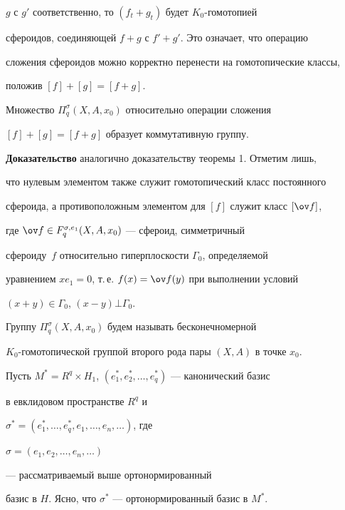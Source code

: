 $g$ с $g'$ соответственно, то $(f_t+g_t)$ будет $K_0$-гомотопией 


сфероидов, соединяющей $f+g$ с $f'+g'$. Это означает, что операцию 


сложения сфероидов можно корректно перенести на гомотопические классы, 


положив $[f]+[g]=[f+g]$. 


 


\begin{thm} 


Множество $\Pi^\sigma_q(X,A,x_0)$ относительно операции сложения 


$[f]+[g]=[f+g]$ образует коммутативную группу. 


\end{thm} 


 


{\bf Доказательство} аналогично доказательству теоремы 1. Отметим лишь, 


что нулевым элементом также служит гомотопический класс постоянного 


сфероида, а противоположным элементом для $[f]$ служит класс $[\ov f]$, 


где $\ov f\in F^{\sigma,e_1}_q(X,A,x_0)$ --- сфероид, симметричный 


сфероиду~$f$ относительно гиперплоскости $\Gamma_0$, определяемой 


уравнением $x e_1=0$, т.\,е. $f(x)=\ov f(y)$ при выполнении условий 


$(x+y)\in\Gamma_0$, $(x-y)\bot\Gamma_0$. 


 


Группу $\Pi^\sigma_q(X,A,x_0)$ будем называть бесконечномерной 


$K_0$-гомотопической группой второго рода пары $(X,A)$ в точке $x_0$. 


 


Пусть $M^*=R^q\times H_1$, $(e^*_1,e^*_2,\dotsc,e^*_q)$ --- канонический базис 


в евклидовом пространстве $R^q$ и 


$\sigma^*=(e^*_1,\dotsc,e^*_q,e_1,\dotsc,e_n,\dotsc)$, где 


$\sigma=(e_1,e_2,\dotsc,e_n,\dotsc)$


--- рассматриваемый выше ортонормированный 


базис в $H$. Ясно, что $\sigma^*$ --- ортонормированный базис в $M^*$. 


